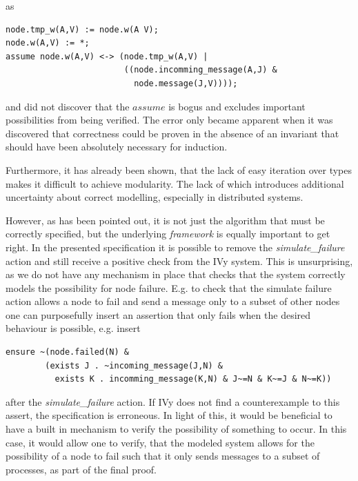 \documentclass[fleqn]{article}
\begin{document}
\noindent as

\begin{mdframed}[nobreak=true, backgroundcolor=light-gray, roundcorner=10pt,leftmargin=1, rightmargin=1, innerleftmargin=15, innertopmargin=15,innerbottommargin=15, outerlinewidth=1, linecolor=light-gray]
\begin{lstlisting}
node.tmp_w(A,V) := node.w(A V);
node.w(A,V) := *;
assume node.w(A,V) <-> (node.tmp_w(A,V) |
                        ((node.incomming_message(A,J) &
                          node.message(J,V))));
\end{lstlisting}
\end{mdframed}
 and did not discover that the $assume$ is bogus and excludes important possibilities from being verified.
 The error only became apparent when it was discovered that correctness could be proven in the absence of an invariant that should have been absolutely necessary for induction.

Furthermore, it has already been shown, that the lack of easy iteration over types makes it difficult to achieve modularity. The lack of which introduces additional uncertainty about correct modelling, especially in distributed systems.


However, as has been pointed out, it is not just the algorithm that must be correctly specified, but the underlying \textit{framework} is equally important to get right. In the presented specification it is possible to remove the \textit{simulate\_failure} action and still receive a positive check from the IVy system. This is unsurprising, as we do not have any mechanism in place that checks that the system correctly models the possibility for node failure. E.g. to check that the simulate failure action allows a node to fail and send a message only to a subset of other nodes one can purposefully insert an assertion that only fails when the desired behaviour is possible, e.g. insert
\begin{mdframed}[nobreak=true, backgroundcolor=light-gray, roundcorner=10pt,leftmargin=1, rightmargin=1, innerleftmargin=15, innertopmargin=15,innerbottommargin=15, outerlinewidth=1, linecolor=light-gray]
\begin{lstlisting}
ensure ~(node.failed(N) &
        (exists J . ~incoming_message(J,N) &
          exists K . incomming_message(K,N) & J~=N & K~=J & N~=K))
\end{lstlisting}
\end{mdframed}
after the \textit{simulate\_failure} action. If IVy does not find a counterexample to this assert, the specification is erroneous.  In light of this, it would be beneficial to have a built in mechanism to verify the possibility of something to occur. In this case, it would allow one to verify, that the modeled system allows for the possibility of a node to fail such that it only sends messages to a subset of processes, as part of the final proof.
\end{document}

